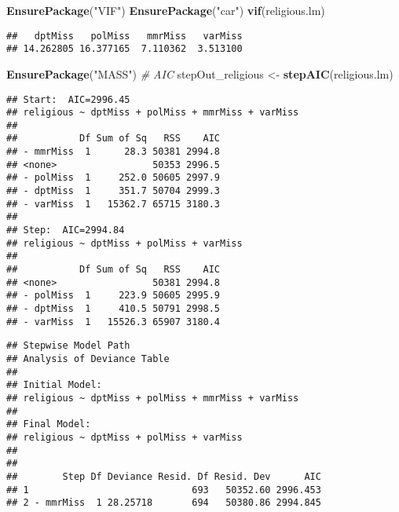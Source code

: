 \documentclass[]{article}
\newenvironment{Shaded}{\begin{snugshade}}{\end{snugshade}}
\newcommand{\CommentTok}[1]{\textcolor[rgb]{0.56,0.35,0.01}{\textit{#1}}}
\newcommand{\KeywordTok}[1]{\textcolor[rgb]{0.13,0.29,0.53}{\textbf{#1}}}
\newcommand{\NormalTok}[1]{#1}
\newcommand{\OperatorTok}[1]{\textcolor[rgb]{0.81,0.36,0.00}{\textbf{#1}}}
\newcommand{\StringTok}[1]{\textcolor[rgb]{0.31,0.60,0.02}{#1}}
\begin{document}
\begin{Shaded}
\begin{Highlighting}[]
\KeywordTok{EnsurePackage}\NormalTok{(}\StringTok{"VIF"}\NormalTok{)}
\KeywordTok{EnsurePackage}\NormalTok{(}\StringTok{"car"}\NormalTok{)}
\KeywordTok{vif}\NormalTok{(religious.lm)}
\end{Highlighting}
\end{Shaded}

\begin{verbatim}
##   dptMiss   polMiss   mmrMiss   varMiss 
## 14.262805 16.377165  7.110362  3.513100
\end{verbatim}

\begin{Shaded}
\begin{Highlighting}[]
\KeywordTok{EnsurePackage}\NormalTok{(}\StringTok{"MASS"}\NormalTok{) }\CommentTok{# AIC}
\NormalTok{stepOut_religious <-}\StringTok{ }\KeywordTok{stepAIC}\NormalTok{(religious.lm)}
\end{Highlighting}
\end{Shaded}

\begin{verbatim}
## Start:  AIC=2996.45
## religious ~ dptMiss + polMiss + mmrMiss + varMiss
## 
##           Df Sum of Sq   RSS    AIC
## - mmrMiss  1      28.3 50381 2994.8
## <none>                 50353 2996.5
## - polMiss  1     252.0 50605 2997.9
## - dptMiss  1     351.7 50704 2999.3
## - varMiss  1   15362.7 65715 3180.3
## 
## Step:  AIC=2994.84
## religious ~ dptMiss + polMiss + varMiss
## 
##           Df Sum of Sq   RSS    AIC
## <none>                 50381 2994.8
## - polMiss  1     223.9 50605 2995.9
## - dptMiss  1     410.5 50791 2998.5
## - varMiss  1   15526.3 65907 3180.4
\end{verbatim}

\begin{Shaded}
\end{Shaded}

\begin{verbatim}
## Stepwise Model Path 
## Analysis of Deviance Table
## 
## Initial Model:
## religious ~ dptMiss + polMiss + mmrMiss + varMiss
## 
## Final Model:
## religious ~ dptMiss + polMiss + varMiss
## 
## 
##        Step Df Deviance Resid. Df Resid. Dev      AIC
## 1                             693   50352.60 2996.453
## 2 - mmrMiss  1 28.25718       694   50380.86 2994.845
\end{verbatim}
\end{document}
